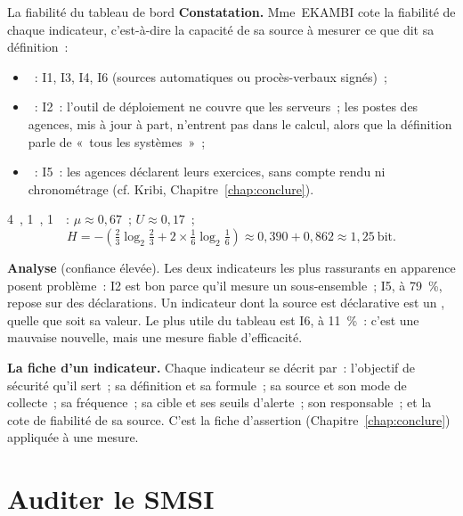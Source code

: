 \begin{boxlecture}{La fiabilité du tableau de bord}
\textbf{Constatation.} Mme~EKAMBI cote la fiabilité de chaque indicateur,
c'est-à-dire la capacité de sa source à mesurer ce que dit sa définition~:
\begin{itemize}
    \item \OUI{}~: I1, I3, I4, I6 (sources automatiques ou procès-verbaux
          signés)~;
    \item \NON{}~: I2~: l'outil de déploiement ne couvre que les serveurs~;
          les postes des agences, mis à jour à part, n'entrent pas dans le
          calcul, alors que la définition parle de «~tous les systèmes~»~;
    \item \NEK{}~: I5~: les agences déclarent leurs exercices, sans compte
          rendu ni chronométrage (cf. Kribi, Chapitre~\ref{chap:conclure}).
\end{itemize}
4~\OUI{}, 1~\NON{}, 1~\NEK{}~: $\mu \approx 0{,}67$~; $U \approx 0{,}17$~;
\[
H = -\left(\tfrac{2}{3}\log_2\tfrac{2}{3} + 2 \times
  \tfrac{1}{6}\log_2\tfrac{1}{6}\right) \approx 0{,}390 + 0{,}862
  \approx 1{,}25~\text{bit}.
\]

\textbf{Analyse} (confiance élevée). Les deux indicateurs les plus
rassurants en apparence posent problème~: I2 est bon parce qu'il mesure un
sous-ensemble~; I5, à 79~\%, repose sur des déclarations. Un indicateur
dont la source est déclarative est un \NEK{}, quelle que soit sa valeur. Le
plus utile du tableau est I6, à 11~\%~: c'est une mauvaise nouvelle, mais
une mesure fiable d'efficacité.

\medskip
\hfill{}
\end{boxlecture}

\begin{boxinfo}
\textbf{La fiche d'un indicateur.} Chaque indicateur se décrit par~:
l'objectif de sécurité qu'il sert~; sa définition et sa formule~; sa source
et son mode de collecte~; sa fréquence~; sa cible et ses seuils d'alerte~;
son responsable~; et la cote de fiabilité de sa source. C'est la fiche
d'assertion (Chapitre~\ref{chap:conclure}) appliquée à une mesure.
\end{boxinfo}

\section{Auditer le SMSI}
\label{sec:c11-audit}

